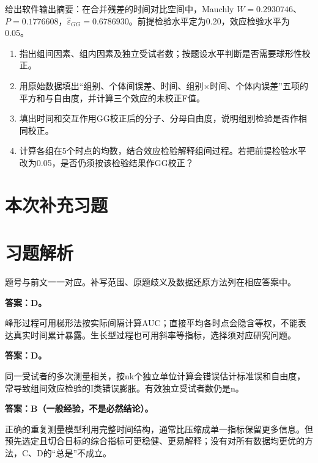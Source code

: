 给出软件输出摘要：在合并残差的时间对比空间中，Mauchly \(W=0.2930746\)、\(P=0.1776608\)，\(\hat\varepsilon_{GG}=0.6786930\)。前提检验水平定为0.20，效应检验水平为0.05。

\begin{enumerate}
\def\labelenumi{\arabic{enumi}.}
\tightlist
\item
  指出组间因素、组内因素及独立受试者数；按题设水平判断是否需要球形性校正。
\item
  用原始数据填出``组别、个体间误差、时间、组别×时间、个体内误差''五项的平方和与自由度，并计算三个效应的未校正F值。
\item
  填出时间和交互作用GG校正后的分子、分母自由度，说明组别检验是否作相同校正。
\item
  计算各组在5个时点的均数，结合效应检验解释组间过程。若把前提检验水平改为0.05，是否仍须按该检验结果作GG校正？
\end{enumerate}



\clearpage\section{本次补充习题}


\clearpage\section{习题解析}

\begin{keyidea}[核对方式]题号与前文一一对应。补写范围、原题歧义及数据还原方法列在相应答案中。\end{keyidea}


\textbf{答案：D。}

峰形过程可用梯形法按实际间隔计算AUC；直接平均各时点会隐含等权，不能表达真实时间累计暴露。生长型过程也可用斜率等指标，选择须对应研究问题。



\textbf{答案：D。}

同一受试者的多次测量相关，按nk个独立单位计算会错误估计标准误和自由度，常导致组间效应检验的I类错误膨胀。有效独立受试者数仍是n。



\textbf{答案：B（一般经验，不是必然结论）。}

正确的重复测量模型利用完整时间结构，通常比压缩成单一指标保留更多信息。但预先选定且切合目标的综合指标可更稳健、更易解释；没有对所有数据均更优的方法，C、D的``总是''不成立。


